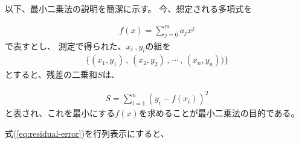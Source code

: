 \documentclass[titlepage]{jsreport}
\begin{document}
{{{以下、最小二乗法の説明を簡潔に示す。
今、想定される多項式を

\large
\begin{eqnarray}
f(x)=\sum_{j=0}^m a_jx^j \nonumber
\end{eqnarray}
\normalsize
で表すとし、
測定で得られた、$x_i$\,,\,$y_i$の組を
\large
\begin{eqnarray}
\{(x_1,y_1)\,,\,(x_2,y_2)\,,\,\cdots\,,\,(x_n,y_n)) \}\nonumber
\end{eqnarray}
\normalsize
とすると、残差の二乗和$S$は、

\large
\begin{eqnarray}
S=\sum_{i=1}^n (y_i-f(x_i))^2\label{eq:residual-error}
\end{eqnarray}
\normalsize
と表され、これを最小にする$f(x)$を求めることが最小二乗法の目的である。

式(\ref{eq:residual-error})を行列表示にすると、

}}}
\end{document}
